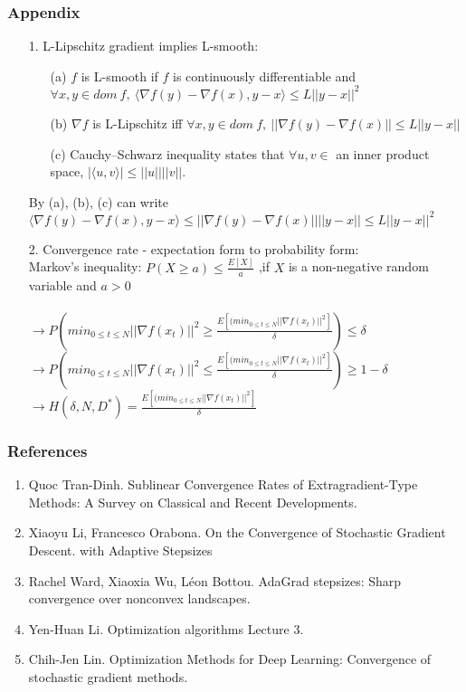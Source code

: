 \documentclass{beamer}
\begin{document}
\begin{frame}
\frametitle{Appendix}
\begin{enumerate} 
    \item [1.] L-Lipschitz gradient implies L-smooth:\\
    \begin{enumerate}
        \item [(a)] $f$ is L-smooth if $f$ is continuously differentiable and $\forall x, y \in dom\ f,\ \langle \nabla f(y) - \nabla f(x), y - x \rangle \leq  L||y - x||^2$
        \item [(b)] $\nabla f$ is L-Lipschitz iff $\forall x, y \in dom\ f,\ ||\nabla f(y)-\nabla f(x)|| \leq L||y-x||$
        \item [(c)] Cauchy–Schwarz inequality states that $\forall u, v \in$ an inner product space, $|\langle u, v \rangle| \leq ||u||||v||$.
    \end{enumerate}
    By (a), (b), (c) can write\\ $\langle \nabla f(y) - \nabla f(x), y - x \rangle \leq ||\nabla f(y) - \nabla f(x)||||y - x|| \leq L ||y - x||^2$
    
    

    \item [2.] Convergence rate - expectation form to probability form:\\
    Markov's inequality: 
    $P(X\geq a)\leq \frac{E[X]}{a}$ ,if $X$ is a non-negative random variable and $a > 0$\\\\
    $\rightarrow P(min_{0\leq t \leq N} ||\nabla f(x_t)||^2 \geq \frac{E[(min_{0\leq t \leq N} ||\nabla f(x_t)||^2]}{\delta}) \leq \delta$\\
    $\rightarrow P(min_{0\leq t \leq N} ||\nabla f(x_t)||^2 \leq \frac{E[(min_{0\leq t \leq N} ||\nabla f(x_t)||^2]}{\delta}) \geq 1-\delta$\\
    $\rightarrow H(\delta, N, D^*)=\frac{E[(min_{0\leq t \leq N} ||\nabla f(x_t)||^2]}{\delta}$
    
\end{enumerate}
\end{frame}
\begin{frame}
\frametitle{References}
\begin{enumerate}
    \item Quoc Tran-Dinh. Sublinear Convergence Rates of Extragradient-Type Methods: A
Survey on Classical and Recent Developments. 
    \item Xiaoyu Li, Francesco Orabona. On the Convergence of Stochastic Gradient Descent.
with Adaptive Stepsizes
    \item Rachel Ward, Xiaoxia Wu, Léon Bottou. AdaGrad stepsizes: Sharp convergence over nonconvex
landscapes.
    \item Yen-Huan Li. Optimization algorithms Lecture 3.
    \item Chih-Jen Lin. Optimization Methods for Deep Learning: Convergence of stochastic gradient methods.
\end{enumerate}
\end{frame}
\end{document}
